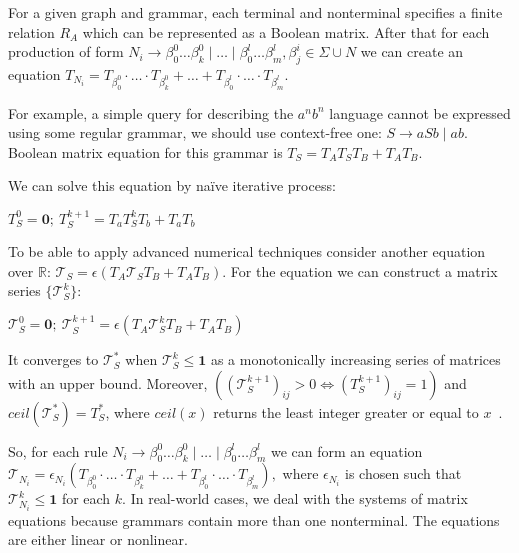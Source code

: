 \documentclass[sigconf, 10pt]{acmart}
\begin{document}
For a given graph and grammar, each terminal and nonterminal specifies a finite relation $R_A$ which can be represented as a Boolean matrix.
After that for each production of form 
$N_i \to \beta^0_0 \dots \beta^0_k \mid \ldots \mid \beta^l_0 \dots \beta^l_m, \beta^i_j \in \Sigma \cup N$ 
we can create an equation 
$T_{N_i} = T_{\beta^0_0}\cdot \ldots \cdot T_{\beta^0_k} + \ldots + T_{\beta^l_0}\cdot \ldots \cdot T_{\beta^l_m}.$

For example, a simple query for describing the $a^nb^n$ language cannot be expressed using some regular grammar, we should use context-free one: $S \rightarrow aSb \mid ab$. 
Boolean matrix equation for this grammar is
$T_S = T_AT_ST_B + T_AT_B.$

We can solve this equation by na\"ive iterative process:
\begin{center}
$T_S^0 = \mathbf{0}; \
T_S^{k+1} = T_a T_S^k T_b + T_a T_b$
\end{center}

To be able to apply advanced numerical techniques consider another equation over $\mathbb{R}$:
$\mathcal{T}_S = \epsilon(T_A \mathcal{T}_S T_B + T_A T_B).$
For the equation we can construct a matrix series $\{ \mathcal{T}_S^{k}\}$: 
\begin{center}
$\mathcal{T}_S^0 = \mathbf{0} ; \
\mathcal{T}_S^{k+1} = \epsilon(T_A \mathcal{T}_S^k T_B + T_A T_B)$
\end{center}

It converges to $\mathcal{T}_S^*$ when $\mathcal{T}_S^{k} \leq \textbf{1}$ as a monotonically increasing series of matrices with an upper bound.
Moreover, $((\mathcal{T}_S^{k+1})_{ij} > 0 \Leftrightarrow (T_S^{k+1})_{ij} = 1)$ and $ceil(\mathcal{T}_S^*) = T_S^*$, where $ceil(x)$ returns the least integer greater or equal to $x$~\cite{sato2017linear}.

So, for each rule 
$N_i \to \beta^0_0 \dots \beta^0_k \mid \ldots \mid \beta^l_0 \dots \beta^l_m$ 
we can form an equation 
$\mathcal{T}_{N_i} = \epsilon_{N_i}(T_{\beta^0_0}\cdot \ldots \cdot T_{\beta^0_k} + \ldots + T_{\beta^l_0}\cdot \ldots \cdot T_{\beta^l_m}), $
where $\epsilon_{N_i}$ is chosen such that $\mathcal{T}_{N_i}^{k} \leq \textbf{1}$ for each $k$.
In real-world cases, we deal with the systems of matrix equations because grammars contain more than one nonterminal.
The equations are either linear or nonlinear.
\end{document}
